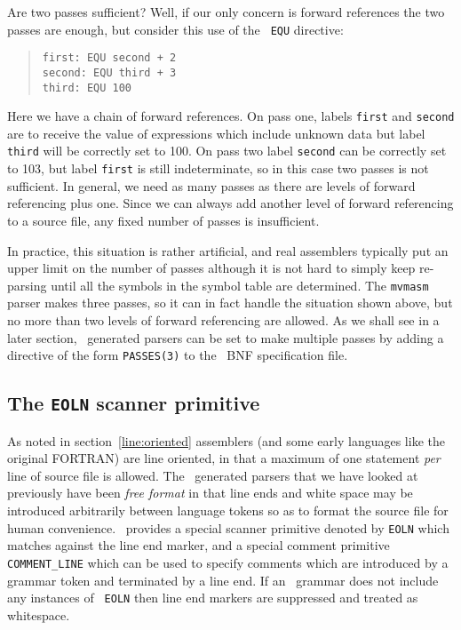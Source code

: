 Are two passes sufficient? Well, if our only concern is forward
references the two passes are enough, but consider this use of the {\tt
EQU} directive:
\begin{quote}
\small
\begin{verbatim}
first: EQU second + 2
second: EQU third + 3
third: EQU 100
\end{verbatim}
\end{quote}
Here we have a chain of forward references. On pass one,
labels {\tt first} and {\tt second} are to receive the value of
expressions which include unknown data but label {\tt third} will be
correctly set to 100. On pass two label {\tt second} can be correctly
set to 103, but label {\tt first} is still indeterminate, so in this case two passes
is not sufficient. In general, we
need as many passes as there are levels of forward referencing plus one.
Since we can always add another level of forward referencing to a source
file, any fixed number of passes is insufficient. 

In practice, this situation is rather artificial, and real assemblers
typically put an upper limit on the number of passes although it is not
hard to simply keep re-parsing until all the symbols in the symbol table
are determined. The {\tt mvmasm} parser makes three passes, so it can in
fact handle the situation shown above, but no more than two levels of
forward referencing are allowed. As we shall see in a later section,
\rdp\ generated parsers can be set to make multiple passes by adding a
directive of the form {\tt PASSES(3)} to the \rdp\ BNF specification file.

\subsection{The {\tt EOLN} scanner primitive}

As noted in section~\ref{line:oriented} assemblers (and some early
languages like the original FORTRAN) are line oriented, in that a
maximum of one statement {\em per} line of source file is allowed.
The \rdp\ generated parsers that we have looked at previously have been
{\em free format} in that line ends and white space may be introduced
arbitrarily between language tokens so as to format the source file for
human convenience. \rdp\ provides a special scanner primitive denoted by
{\tt EOLN} which matches against the line end marker, and a special
comment primitive \verb+COMMENT_LINE+ which can be used to specify
comments which are introduced by a grammar token and terminated by a
line end. If an \rdp\ grammar does not include any instances of {\tt
EOLN} then line end markers are suppressed and treated as whitespace.

